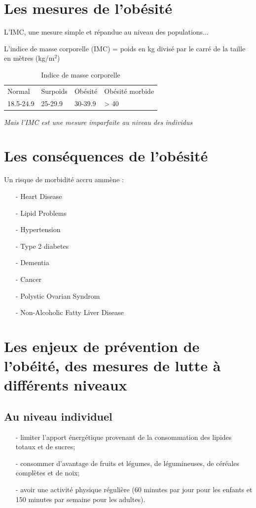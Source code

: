 \documentclass[11pt]{article}
\begin{document}
  \newpage
  \section{Les mesures de l'obésité}

L'IMC, une mesure simple et répandue au niveau des populations...

L'indice de masse corporelle (IMC) = poids en kg divisé par le carré de la taille en mètres (kg/m$^2$)

\begin{table}[h!]
\centering
\begin{tabular}{|m{3cm}|m{3cm}|m{3cm}|m{3cm}|}
\hline
\rowcolor{green!50}
Normal & Surpoids & Obésité & Obésité morbide \\
\rowcolor{green!25}
18.5-24.9 & 25-29.9 & 30-39.9 & > 40 \\
\hline
\end{tabular}
\caption{Indice de masse corporelle}
\end{table}

\textit{Mais l'IMC est une mesure imparfaite au niveau des individus}

\section{Les conséquences de l'obésité}
Un risque de morbidité accru ammène :
\begin{itemize}
    \item[-] Heart Disease
    \item[-] Lipid Problems
    \item[-] Hypertension
    \item[-] Type 2 diabetes
    \item[-] Dementia
    \item[-] Cancer
    \item[-] Polystic Ovarian Syndrom
    \item[-] Non-Alcoholic Fatty Liver Disease 
\end{itemize}

\section{Les enjeux de prévention de l'obéité, des mesures de lutte à différents niveaux}

\subsection{Au niveau individuel}
\begin{itemize}
    \item[-] limiter l'apport énergétique provenant de la consommation des lipides totaux et de sucres;
    \item[-] consommer d'avantage de fruits et légumes, de légumineuses, de céréales complètes et de noix;
    \item[-] avoir une activité physique régulière (60 minutes par jour pour les enfants et 150 minutes par semaine pour les adultes).
\end{itemize}
\end{document}
